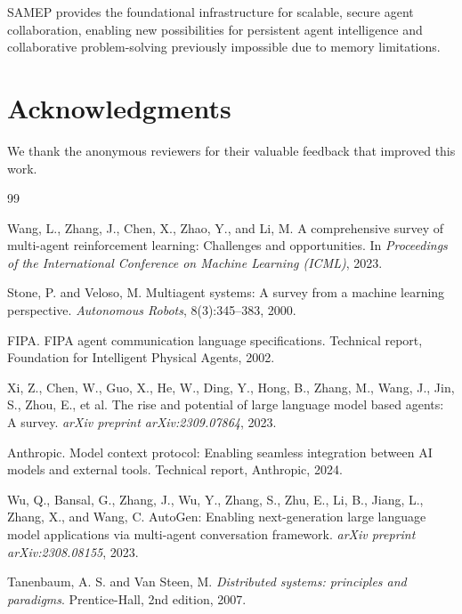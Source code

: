 \documentclass[11pt]{article}
\begin{document}
SAMEP provides the foundational infrastructure for scalable, secure agent collaboration, enabling new possibilities for persistent agent intelligence and collaborative problem-solving previously impossible due to memory limitations.

\section*{Acknowledgments}

We thank the anonymous reviewers for their valuable feedback that improved this work.


\begin{thebibliography}{99}

Wang, L., Zhang, J., Chen, X., Zhao, Y., and Li, M.
\newblock A comprehensive survey of multi-agent reinforcement learning: Challenges and opportunities.
\newblock In \emph{Proceedings of the International Conference on Machine Learning (ICML)}, 2023.

Stone, P. and Veloso, M.
\newblock Multiagent systems: A survey from a machine learning perspective.
\newblock \emph{Autonomous Robots}, 8(3):345--383, 2000.

FIPA.
\newblock FIPA agent communication language specifications.
\newblock Technical report, Foundation for Intelligent Physical Agents, 2002.

Xi, Z., Chen, W., Guo, X., He, W., Ding, Y., Hong, B., Zhang, M., Wang, J., Jin, S., Zhou, E., et al.
\newblock The rise and potential of large language model based agents: A survey.
\newblock \emph{arXiv preprint arXiv:2309.07864}, 2023.

Anthropic.
\newblock Model context protocol: Enabling seamless integration between AI models and external tools.
\newblock Technical report, Anthropic, 2024.

Wu, Q., Bansal, G., Zhang, J., Wu, Y., Zhang, S., Zhu, E., Li, B., Jiang, L., Zhang, X., and Wang, C.
\newblock AutoGen: Enabling next-generation large language model applications via multi-agent conversation framework.
\newblock \emph{arXiv preprint arXiv:2308.08155}, 2023.

Tanenbaum, A. S. and Van Steen, M.
\newblock \emph{Distributed systems: principles and paradigms}.
\newblock Prentice-Hall, 2nd edition, 2007.


\end{thebibliography}
\end{document}
